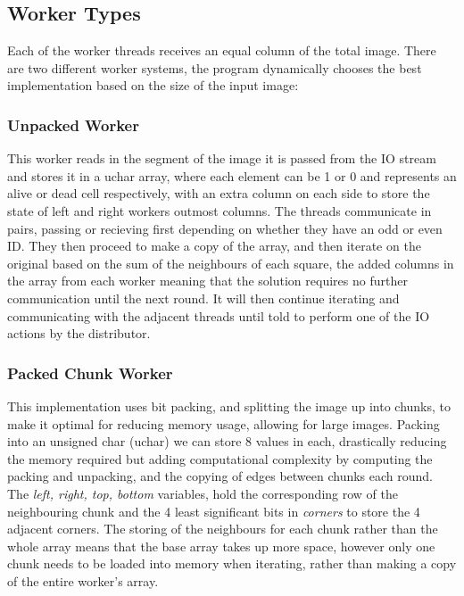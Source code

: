 \documentclass[11pt, oneside]{article}
\begin{document}
\subsection{Worker Types}
\vspace{-2mm}
Each of the worker threads receives an equal column of the total image. There are two different worker systems, the program dynamically chooses the best implementation based on the size of the input image:

\vspace{-4mm}
\subsubsection{Unpacked Worker}
\vspace{-3mm}

This worker reads in the segment of the image it is passed from the IO stream and stores it in a uchar array, where each element can be 1 or 0 and represents an alive or dead cell respectively, with an extra column on each side to store the state of left and right workers outmost columns. The threads communicate in pairs, passing or recieving first depending on whether they have an odd or even ID. They then proceed to make a copy of the array, and then iterate on the original based on the sum of the neighbours of each square, the added columns in the array from each worker meaning that the solution requires no further communication until the next round. It will then continue iterating and communicating with the adjacent threads until told to perform one of the IO actions by the distributor.

\vspace{-4mm}
\subsubsection{Packed Chunk Worker}
\vspace{-3mm}

This implementation uses bit packing, and splitting the image up into chunks, to make it optimal for reducing memory usage, allowing for large images.
Packing into an unsigned char (uchar) we can store 8 values in each, drastically reducing the memory required but adding computational complexity by computing the packing and unpacking, and the copying of edges between chunks each round. The \emph{left, right, top, bottom} variables, hold the corresponding row of the neighbouring chunk and the 4 least significant bits in \emph{corners} to store the 4 adjacent corners. The storing of the neighbours for each chunk rather than the whole array means that the base array takes up more space, however only one chunk needs to be loaded into memory when iterating, rather than making a copy of the entire worker's array.
\end{document}
